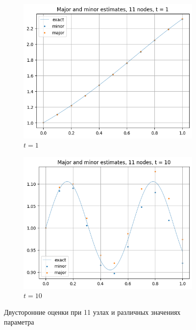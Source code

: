 \begin{figure}[H]
	\centering
	\begin{subfigure}{0.45\textwidth}
		\centering
		\includegraphics[width=\linewidth]{img/visualization/TwoSided11nodest1}
		\caption{$t = 1$}
	\end{subfigure}
	\hfill
	\begin{subfigure}{0.45\textwidth}
		\centering
		\includegraphics[width=\linewidth]{img/visualization/TwoSided11nodest2}
		\caption{$t = 10$}
	\end{subfigure}
	\caption{Двусторонние оценки при 11 узлах и различных значениях параметра}
	\label{fig:two_graphs}
\end{figure}

